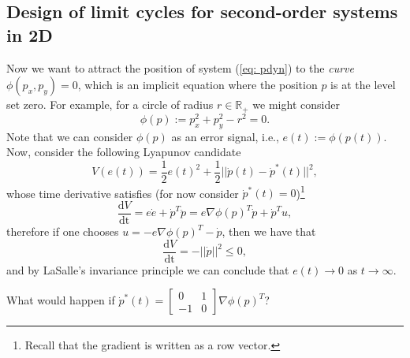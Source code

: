 \documentclass[11pt,a4paper,titlepage]{article}
\begin{document}
	\subsection{Design of limit cycles for second-order systems in 2D}
	Now we want to attract the position of system (\ref{eq: pdyn}) to the \emph{curve} $\phi(p_x, p_y) = 0$, which is an implicit equation where the position $p$ is at the level set zero. For example, for a circle of radius $r\in\mathbb{R}_+$ we might consider
	\begin{equation}
	\phi(p) := p_x^2 + p_y^2 - r^2 = 0.
	\end{equation}
	Note that we can consider $\phi(p)$ as an error signal, i.e., $e(t) := \phi(p(t))$. Now, consider the following Lyapunov candidate
\begin{equation}
	V(e(t)) = \frac{1}{2}e(t)^2 + \frac{1}{2}||\dot p(t) - \dot p^*(t)||^2,
	\label{eq: Ve2}
\end{equation}
	whose time derivative satisfies (for now consider $\dot p^*(t) = 0$)\footnote{Recall that the gradient is written as a row vector.}
	\begin{equation}
		\frac{\mathrm{d}V}{\mathrm{dt}} = e\dot e + \dot p^T\ddot p = e \nabla\phi(p)^T \dot p + \dot p^T u,
	\end{equation}
	therefore if one chooses $u = -e \nabla\phi(p)^T -\dot p$, then we have that
	\begin{equation}
\frac{\mathrm{d}V}{\mathrm{dt}} = -||\dot p||^2 \leq 0,
	\end{equation}
and by LaSalle's invariance principle we can conclude that $e(t) \to 0$ as $t\to\infty$.

What would happen if $\dot p^*(t) = \begin{bmatrix}0 & 1 \\ -1 & 0\end{bmatrix}\nabla\phi(p)^T$?
\end{document}
